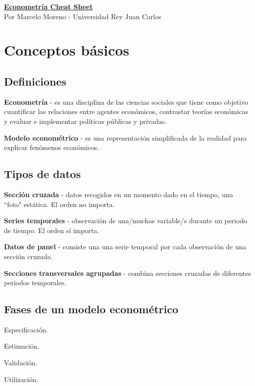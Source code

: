 \documentclass[10pt, a4paper, landscape]{extarticle}
\begin{document}
\setlength{\footskip}{12pt}
\begin{multicols}{3} %

\begin{center}
\textbf{\LARGE \href{https://github.com/marcelomijas/econometrics-cheatsheet}{Econometría Cheat Sheet}} \\ {\footnotesize Por Marcelo Moreno - Universidad Rey Juan Carlos}
\end{center}

\section*{Conceptos básicos}
\subsection*{Definiciones}

\textbf{Econometría} - es una disciplina de las ciencias sociales que tiene como objetivo cuantificar las relaciones entre agentes económicos, contrastar teorías económicas y evaluar e implementar políticas públicas y privadas.

\textbf{Modelo econométrico} - es una representación simplificada de la realidad para explicar fenómenos económicos.

\subsection*{Tipos de datos}

\textbf{Sección cruzada} - datos recogidos en un momento dado en el tiempo, una ``foto" estática. El orden no importa.

\textbf{Series temporales} - observación de una/muchas variable/s durante un periodo de tiempo. El orden sí importa.

\textbf{Datos de panel} - consiste una una serie temporal por cada observación de una sección cruzada.

\textbf{Secciones transversales agrupadas} - combina secciones cruzadas de diferentes periodos temporales.

\subsection*{Fases de un modelo econométrico}

\begin{enumerate}[leftmargin=*]
\setlength{\multicolsep}{0pt}
\begin{multicols}{2}
\item Especificación.
\item Estimación.
\columnbreak
\item Validación.
\item Utilización.
\end{multicols}
\end{enumerate}


\end{multicols}
\end{document}
